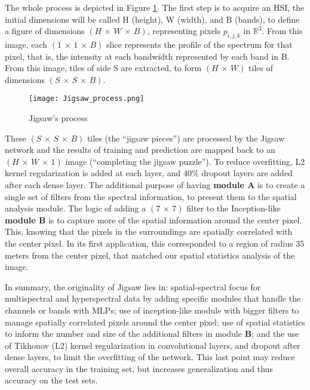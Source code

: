 \documentclass[lettersize, journal]{IEEEtran}
\begin{document}
The whole process is depicted in Figure \ref{fig:Jigsaw_process}. The first step is to acquire an HSI, the initial dimensions will be called H (height), W (width), and B (bands), to define a figure of dimensions $(H \, \times \, W \, \times \, B)$, representing pixels $p_{i,j,k}$ in $\mathbb{R}^3$. From this image, each $(1 \, \times \, 1 \, \times \, B)$ slice represents the profile of the spectrum for that pixel, that is, the intensity at each bandwidth represented by each band in B. From this image, tiles of side S are extracted, to form $(H \, \times \, W)$ tiles of dimensions $(S \, \times \, S \, \times \, B)$.

\begin{figure}[!hbt]
    \centering
    \texttt{[image: Jigsaw\_process.png]}
    \caption{Jigsaw's process}
    \label{fig:Jigsaw_process}
\end{figure}

These $(S \, \times \, S \, \times \, B)$ tiles (the “jigsaw pieces”) are processed by the Jigsaw network and the results of training and prediction are mapped back to an $(H \, \times \, W \, \times \, 1)$ image (“completing the jigsaw puzzle”).
To reduce overfitting, L2 kernel regularization is added at each layer, and 40\% dropout layers are added after each dense layer. 
The additional purpose of having \textbf{module A} is to create a single set of filters from the spectral information, to present them to the spatial analysis module. The logic of adding a $(7 \, \times \, 7)$ filter to the Inception-like \textbf{module B} is to capture more of the spatial information around the center pixel. This, knowing that the pixels in the surroundings are spatially correlated with the center pixel. In its first application, this corresponded to a region of radius 35 meters from the center pixel, that matched our spatial statistics analysis of the image.

In summary, the originality of Jigsaw lies in: spatial-spectral focus for multispectral and hyperspectral data by adding specific modules that handle the channels or bands with MLPs; use of inception-like module with bigger filters to manage spatially correlated pixels around the center pixel; use of spatial statistics to inform the number and size of the additional filters in module \textbf{B}; and the use of Tikhonov (L2) kernel regularization in convolutional layers, and dropout after dense layers, to limit the overfitting of the network. This last point may reduce overall accuracy in the training set, but increases generalization and thus accuracy on the test sets.
\end{document}
